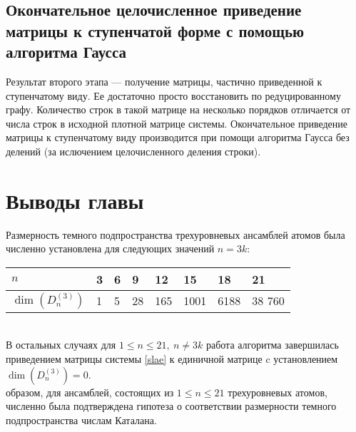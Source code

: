 \subsection{Окончательное целочисленное приведение матрицы к ступенчатой форме с помощью алгоритма Гаусса}\label{subsec:ch4/subsect3}
Результат второго этапа --- получение матрицы, частично приведенной к ступенчатому виду. Ее достаточно просто восстановить по редуцированному графу. Количество строк в
такой матрице на несколько порядков отличается от числа строк в исходной плотной матрице системы. Окончательное приведение матрицы к ступенчатому виду производится при
помощи алгоритма Гаусса без делений (за ислючением целочисленного деления строки).

\section{Выводы главы}\label{sec:ch4/sect4}
Размерность темного подпространства трехуровневых ансамблей атомов была численно
установлена для следующих значений $n = 3k$:

\noindent\begin{tabular}[t]{|p{5em}|p{3em}|p{3em}|p{3em}|p{3em}|p{4em}|p{4em}|p{4em}|}
	\hline
	$n$ & 3 & 6 & 9 & 12 & 15 & 18 & 21 \\
	\hline
	$\dim(D^{(3)}_n)$ & 1 & 5 & 28 & 165 & 1001 & 6188 & 38 760 \\
	\hline
\end{tabular}\
\\[12pt]

\noindent В остальных случаях для $1 \le n \le 21,~n \ne 3k$ работа алгоритма завершилась приведением матрицы системы \eqref{slae} к единичной матрице c установлением $\dim(D^{(3)}_{n}) = 0$.
\\[12pt]
 образом, для ансамблей, состоящих из $1 \le n \le 21$ трехуровневых атомов, численно была подтверждена гипотеза о соответствии размерности темного подпространства числам Каталана.
